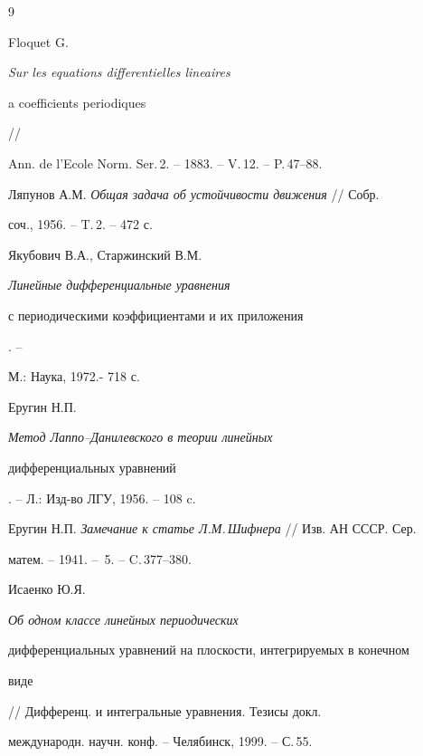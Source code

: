 \begin{thebibliography}{9} 


 




Floquet G. {\em Sur les equations differentielles lineaires 


a coefficients periodiques} // 


Ann. de l'Ecole Norm. Ser.\,2. -- 1883. -- V.\,12. -- P.\,47--88. 




Ляпунов А.М. {\em Общая задача об устойчивости движения} // Собр. 


соч., 1956. -- T.\,2. -- 472 с.




Якубович В.А., Старжинский В.М. {\em Линейные дифференциальные уравнения 


с периодическими коэффициентами и их приложения}. -- 


М.: Наука, 1972.- 718 с. 




Еругин Н.П. {\em Метод Лаппо--Данилевского в теории линейных 


дифференциальных уравнений}. -- Л.: Изд-во ЛГУ, 1956. -- 108 c. 




Еругин Н.П. {\em Замечание к статье Л.М.\,Шифнера} // Изв. АН СССР. Сер. 


матем. -- 1941. -- \No\,5. -- C.\,377--380. 




Исаенко Ю.Я. {\em Об одном классе линейных периодических 


дифференциальных уравнений на плоскости, интегрируемых в конечном 


виде} // Дифференц. и интегральные уравнения. Тезисы докл. 


международн. научн. конф. -- Челябинск, 1999. -- С.\,55.


 


\end{thebibliography} 


 


\vskip 2cm 


 






 


\label{end} 


 


